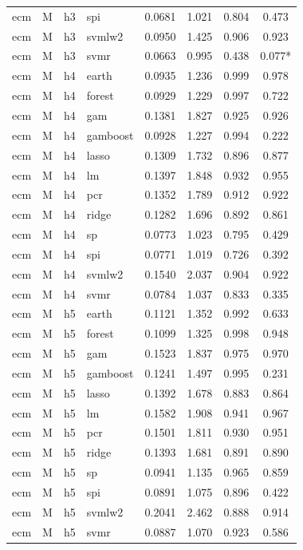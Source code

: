 \begin{ThreePartTable}
\begin{longtable}[t]{llclcccc}
ecm & M & h3 & spi & 0.0681 & 1.021 & 0.804 & 0.473\\
ecm & M & h3 & svmlw2 & 0.0950 & 1.425 & 0.906 & 0.923\\
ecm & M & h3 & svmr & 0.0663 & 0.995 & 0.438 & 0.077*\\
\addlinespace
ecm & M & h4 & earth & 0.0935 & 1.236 & 0.999 & 0.978\\
ecm & M & h4 & forest & 0.0929 & 1.229 & 0.997 & 0.722\\
ecm & M & h4 & gam & 0.1381 & 1.827 & 0.925 & 0.926\\
ecm & M & h4 & gamboost & 0.0928 & 1.227 & 0.994 & 0.222\\
ecm & M & h4 & lasso & 0.1309 & 1.732 & 0.896 & 0.877\\
ecm & M & h4 & lm & 0.1397 & 1.848 & 0.932 & 0.955\\
ecm & M & h4 & pcr & 0.1352 & 1.789 & 0.912 & 0.922\\
ecm & M & h4 & ridge & 0.1282 & 1.696 & 0.892 & 0.861\\
ecm & M & h4 & sp & 0.0773 & 1.023 & 0.795 & 0.429\\
ecm & M & h4 & spi & 0.0771 & 1.019 & 0.726 & 0.392\\
ecm & M & h4 & svmlw2 & 0.1540 & 2.037 & 0.904 & 0.922\\
ecm & M & h4 & svmr & 0.0784 & 1.037 & 0.833 & 0.335\\
\addlinespace
ecm & M & h5 & earth & 0.1121 & 1.352 & 0.992 & 0.633\\
ecm & M & h5 & forest & 0.1099 & 1.325 & 0.998 & 0.948\\
ecm & M & h5 & gam & 0.1523 & 1.837 & 0.975 & 0.970\\
ecm & M & h5 & gamboost & 0.1241 & 1.497 & 0.995 & 0.231\\
ecm & M & h5 & lasso & 0.1392 & 1.678 & 0.883 & 0.864\\
ecm & M & h5 & lm & 0.1582 & 1.908 & 0.941 & 0.967\\
ecm & M & h5 & pcr & 0.1501 & 1.811 & 0.930 & 0.951\\
ecm & M & h5 & ridge & 0.1393 & 1.681 & 0.891 & 0.890\\
ecm & M & h5 & sp & 0.0941 & 1.135 & 0.965 & 0.859\\
ecm & M & h5 & spi & 0.0891 & 1.075 & 0.896 & 0.422\\
ecm & M & h5 & svmlw2 & 0.2041 & 2.462 & 0.888 & 0.914\\
ecm & M & h5 & svmr & 0.0887 & 1.070 & 0.923 & 0.586\\

\end{longtable}
\end{ThreePartTable}
